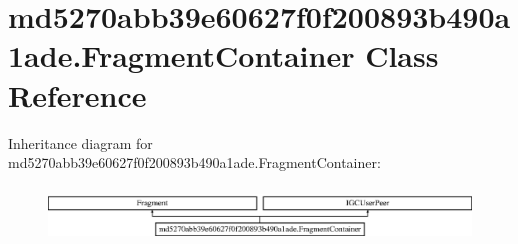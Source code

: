 \hypertarget{classmd5270abb39e60627f0f200893b490a1ade_1_1FragmentContainer}{}\section{md5270abb39e60627f0f200893b490a1ade.\+Fragment\+Container Class Reference}
\label{classmd5270abb39e60627f0f200893b490a1ade_1_1FragmentContainer}
Inheritance diagram for md5270abb39e60627f0f200893b490a1ade.\+Fragment\+Container\+:\begin{figure}[H]
\begin{center}
\leavevmode
\includegraphics[height=1.501341cm]{classmd5270abb39e60627f0f200893b490a1ade_1_1FragmentContainer}
\end{center}
\end{figure}
